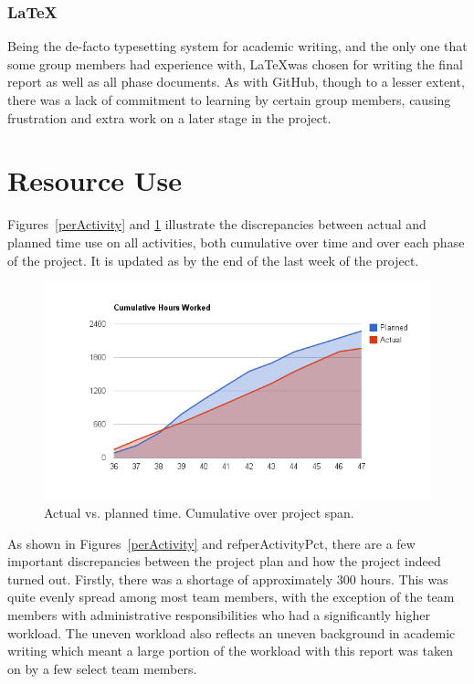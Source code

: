\subsubsection{\LaTeX}
Being the de-facto typesetting system for academic writing, and the
only one that some group members had experience with, \LaTeX was
chosen for writing the final report as well as all phase documents. As
with GitHub, though to a lesser extent,  there was a lack of commitment to learning by certain
group members, causing frustration and extra work on a later stage
in the project.


\section{Resource Use}\label{resourceUse}

Figures~\ref{perActivity} and \ref{actualPlannedCuml} illustrate
the discrepancies between actual and planned time use on all
activities, both cumulative over time and over each phase of the
project. It is updated as by the end of the last week of the project.

\begin{centering}
  \begin{figure}[h!]
    \includegraphics[width = \textwidth]{Evaluation/actual_v_planned_cuml}
    \caption{Actual vs. planned time. Cumulative over project span.}
    \label{actualPlannedCuml}
  \end{figure}
\end{centering}

As shown in Figures~\ref{perActivity} and ref{perActivityPct}, there are a few important discrepancies between the project plan and how the project indeed turned out. Firstly, there was a shortage of approximately 300 hours. This was quite evenly spread among most team members, with the exception of the team members with administrative responsibilities who had a significantly higher workload. The uneven workload also reflects an uneven background in academic writing which meant a large portion of the workload with this report was taken on by a few select team members.

